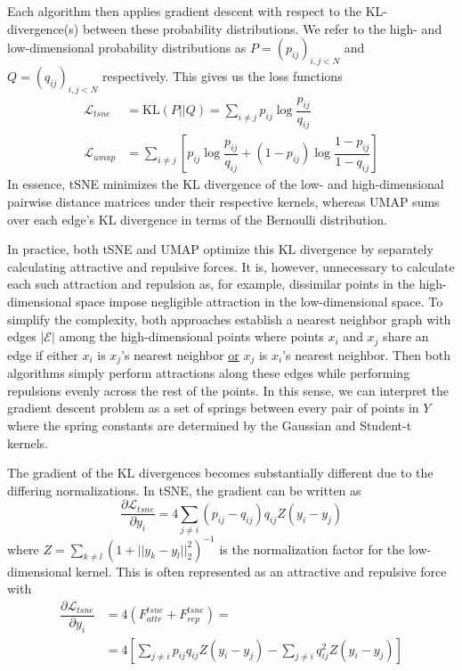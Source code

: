 \documentclass{article}
\theoremstyle{definition}
\begin{document}
Each algorithm then applies gradient descent with respect to the KL-divergence(s) between these probability distributions. We refer to the high- and
low-dimensional probability
distributions as $P = \left( p_{ij} \right)_{i, j < N}$ and $Q = \left( q_{ij}
\right)_{i, j < N}$ respectively. This gives us the loss functions
\begin{align}
    \mathcal{L}_{tsne} &= \text{KL} (P || Q) = \sum_{i \neq j} p_{ij} \log \dfrac{p_{ij}}{q_{ij}} \\
    \mathcal{L}_{umap} &= \sum_{i \neq j} \left[ p_{ij} \log \dfrac{p_{ij}}{q_{ij}} + (1 - p_{ij}) \log \dfrac{1 - p_{ij}}{1 - q_{ij}} \right]
\end{align}
In essence, tSNE minimizes the KL divergence of the low- and high-dimensional pairwise distance matrices under their respective kernels, whereas UMAP sums over
each edge's KL divergence in terms of the Bernoulli distribution.

In practice, both tSNE and UMAP optimize this KL divergence by separately calculating attractive and repulsive forces. It is, however, unnecessary to calculate
each such attraction and repulsion as, for example, dissimilar points in the high-dimensional space impose negligible attraction in the low-dimensional space.
To simplify the complexity, both approaches establish a nearest neighbor graph \cite{van2014accelerating} with edges $|\mathcal{E}|$ among the
high-dimensional points where points $x_i$ and $x_j$ share an edge if either $x_i$ is $x_j$'s nearest neighbor \underline{or} $x_j$ is $x_i$'s nearest neighbor.
Then both algorithms simply perform attractions along these edges while performing repulsions evenly across the rest of the points. In this sense, we can
interpret the gradient descent problem as a set of springs between every pair of points in $Y$ where the spring constants are determined by the Gaussian and
Student-t kernels.

The gradient of the KL divergences becomes substantially different due to the differing normalizations. In tSNE, the gradient can be written as
\begin{equation}
    \dfrac{\partial \mathcal{L}_{tsne}}{\partial y_i} = 4 \sum_{j \neq i} (p_{ij} - q_{ij}) q_{ij} Z (y_i - y_j)
\end{equation}
where $Z = \sum_{k \neq l} (1 + ||y_k - y_l||_2^2)^{-1}$ is the normalization factor for the low-dimensional kernel. This is often represented as an attractive
and repulsive force with
\begin{align*}
    \dfrac{\partial \mathcal{L}_{tsne}}{\partial y_i} &= 4(F^{tsne}_{attr} + F^{tsne}_{rep}) = \\
    &= 4 \left[ \sum_{j \neq i} p_{ij}q_{ij}Z (y_i - y_j) - \sum_{j \neq i} q_{ij}^2
Z (y_i - y_j) \right]
\end{align*}
\end{document}
